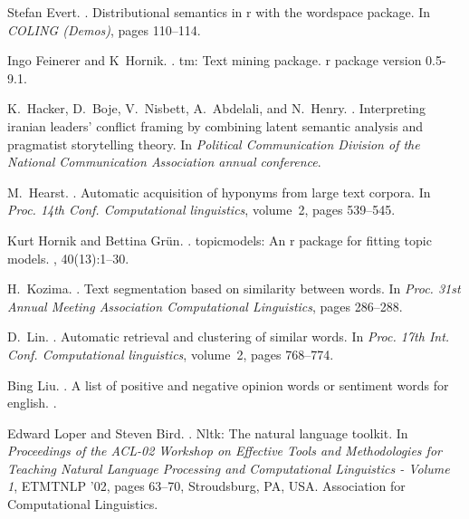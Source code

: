 \documentclass[11pt]{article}
\begin{document}
\begin{thebibliography}{}
Stefan Evert.
.
\newblock Distributional semantics in r with the wordspace package.
\newblock In {\em COLING (Demos)}, pages 110--114.

Ingo Feinerer and K~Hornik.
.
\newblock tm: Text mining package. r package version 0.5-9.1.

K.~Hacker, D.~Boje, V.~Nisbett, A.~Abdelali, and N.~Henry.
.
\newblock Interpreting iranian leaders' conflict framing by combining latent
  semantic analysis and pragmatist storytelling theory.
\newblock In {\em Political Communication Division of the National
  Communication Association annual conference}.

M.~Hearst.
.
\newblock Automatic acquisition of hyponyms from large text corpora.
\newblock In {\em Proc. 14th Conf. Computational linguistics}, volume~2, pages
  539--545.

Kurt Hornik and Bettina Gr{\"u}n.
.
\newblock topicmodels: An r package for fitting topic models.
, 40(13):1--30.

H.~Kozima.
.
\newblock Text segmentation based on similarity between words.
\newblock In {\em Proc. 31st Annual Meeting Association Computational
  Linguistics}, pages 286--288.

D.~Lin.
.
\newblock Automatic retrieval and clustering of similar words.
\newblock In {\em Proc. 17th Int. Conf. Computational linguistics}, volume~2,
  pages 768--774.

Bing Liu.
.
\newblock A list of positive and negative opinion words or sentiment words for
  english.
\newblock {\em l{\'\i}nea]. Disponible en: http://www. cs. uic. edu/\~{}
  liub/.[{\'U}ltimo acceso: Junio 2015]}.

Edward Loper and Steven Bird.
.
\newblock Nltk: The natural language toolkit.
\newblock In {\em Proceedings of the ACL-02 Workshop on Effective Tools and
  Methodologies for Teaching Natural Language Processing and Computational
  Linguistics - Volume 1}, ETMTNLP '02, pages 63--70, Stroudsburg, PA, USA.
  Association for Computational Linguistics.


\end{thebibliography}
\end{document}
